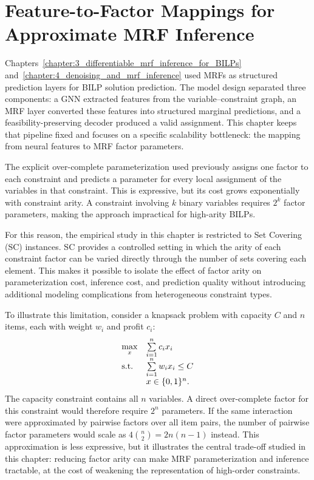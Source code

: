 \chapter{Feature-to-Factor Mappings for Approximate MRF Inference}\label{chapter:5_feature-to-factor_mappings_for_approximate_mrf_inference}

Chapters~\ref{chapter:3_differentiable_mrf_inference_for_BILPs} and~\ref{chapter:4_denoising_and_mrf_inference} used MRFs as structured prediction layers for BILP solution prediction. The model design separated three components: a GNN extracted features from the variable--constraint graph, an MRF layer converted these features into structured marginal predictions, and a feasibility-preserving decoder produced a valid assignment. This chapter keeps that pipeline fixed and focuses on a specific scalability bottleneck: the mapping from neural features to MRF factor parameters.

The explicit over-complete parameterization used previously assigns one factor to each constraint and predicts a parameter for every local assignment of the variables in that constraint. This is expressive, but its cost grows exponentially with constraint arity. A constraint involving $k$ binary variables requires $2^k$ factor parameters, making the approach impractical for high-arity BILPs.

For this reason, the empirical study in this chapter is restricted to Set Covering (SC) instances. SC provides a controlled setting in which the arity of each constraint factor can be varied directly through the number of sets covering each element. This makes it possible to isolate the effect of factor arity on parameterization cost, inference cost, and prediction quality without introducing additional modeling complications from heterogeneous constraint types.

To illustrate this limitation, consider a knapsack problem with capacity $C$ and $n$ items, each with weight $w_i$ and profit $c_i$:
\begin{equation}
    \begin{array}{ll}
        \max\limits_{x} & \sum\limits_{i=1}^n c_i x_i \\
        \text{s.t.}     & \sum\limits_{i=1}^n w_i x_i \leq C \\
                        & x \in \{0,1\}^n .
    \end{array}
\end{equation}
The capacity constraint contains all $n$ variables. A direct over-complete factor for this constraint would therefore require $2^n$ parameters. If the same interaction were approximated by pairwise factors over all item pairs, the number of pairwise factor parameters would scale as $4\binom{n}{2}=2n(n-1)$ instead. This approximation is less expressive, but it illustrates the central trade-off studied in this chapter: reducing factor arity can make MRF parameterization and inference tractable, at the cost of weakening the representation of high-order constraints.

